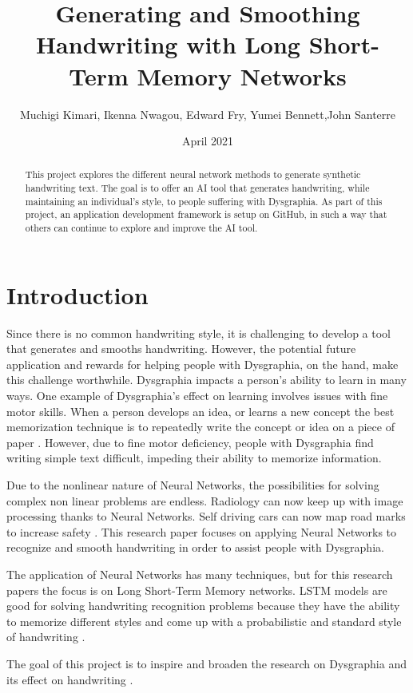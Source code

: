 \documentclass{article}
\title{Generating and Smoothing Handwriting with Long Short-Term Memory Networks}
\author{Muchigi Kimari, Ikenna Nwagou, Edward Fry, Yumei Bennett,John Santerre}
\date{April 2021}
\begin{document}
\maketitle

\begin{abstract}
    This project explores the different neural network methods to generate synthetic handwriting text. The goal is to offer an AI tool that generates handwriting, while maintaining an individual's style, to people suffering with Dysgraphia. As part of this project, an application development framework is setup on GitHub, in such a way that others can continue to explore and improve the AI tool.
\end{abstract}

\section{Introduction}

Since there is no common handwriting style, it is challenging to develop a tool that generates and smooths handwriting. However, the potential future application and rewards for helping people with Dysgraphia, on the hand, make this challenge worthwhile. Dysgraphia impacts a person’s ability to learn in many ways. One example of Dysgraphia’s effect on learning involves issues with fine motor skills. When a person develops an idea, or learns a new concept the best memorization technique is to repeatedly write the concept or idea on a piece of paper \cite{Dysgraphia_intro}. However, due to fine motor deficiency, people with Dysgraphia find writing simple text difficult, impeding their ability to memorize information.

Due to the nonlinear nature of Neural Networks, the possibilities for solving complex non linear problems are endless. Radiology can now keep up with image processing thanks to Neural Networks. Self driving cars can now map road marks to increase safety \cite{Radiology}. This research paper focuses on applying Neural Networks to recognize and smooth handwriting in order to assist people with Dysgraphia.

The application of Neural Networks has many techniques, but for this research papers the focus is on Long Short-Term Memory networks. LSTM models are good for solving handwriting recognition problems because they have the ability to memorize different styles and come up with a probabilistic and standard style of handwriting \cite{LSTM_Style}.

The goal of this project is to inspire and broaden the research on Dysgraphia and its effect on handwriting \cite{Paper_Intro2}.
\end{document}
